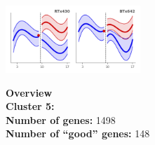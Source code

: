 \begin{multicols}{2}
\includegraphics[width=2in]{figures/clusters/leaf_Postflowering_4.png}
\columnbreak

\noindent \textbf{Overview}\\\textbf{Cluster 5:}  \\
\textbf{Number of genes:} 1498 \\
\textbf{Number of ``good'' genes:} 148 \\
\end{multicols}

